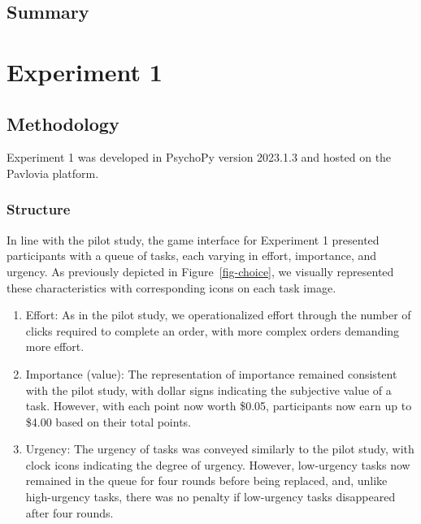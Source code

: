 \documentclass[
]{report}
\begin{document}
\hypertarget{summary}{%
\section{Summary}\label{summary}}

\hypertarget{experiment-1}{%
\chapter{Experiment 1}\label{experiment-1}}

\hypertarget{methodology-1}{%
\section{Methodology}\label{methodology-1}}

Experiment 1 was developed in PsychoPy version 2023.1.3 and hosted on
the Pavlovia platform.

\hypertarget{structure-1}{%
\subsection{Structure}\label{structure-1}}

In line with the pilot study, the game interface for Experiment 1
presented participants with a queue of tasks, each varying in effort,
importance, and urgency. As previously depicted in
Figure~\ref{fig-choice}, we visually represented these characteristics
with corresponding icons on each task image.

\begin{enumerate}
\def\labelenumi{\arabic{enumi}.}
\item
  Effort: As in the pilot study, we operationalized effort through the
  number of clicks required to complete an order, with more complex
  orders demanding more effort.
\item
  Importance (value): The representation of importance remained
  consistent with the pilot study, with dollar signs indicating the
  subjective value of a task. However, with each point now worth \$0.05,
  participants now earn up to \$4.00 based on their total points.
\item
  Urgency: The urgency of tasks was conveyed similarly to the pilot
  study, with clock icons indicating the degree of urgency. However,
  low-urgency tasks now remained in the queue for four rounds before
  being replaced, and, unlike high-urgency tasks, there was no penalty
  if low-urgency tasks disappeared after four rounds.
\end{enumerate}
\end{document}
